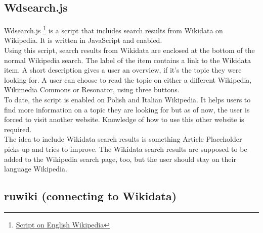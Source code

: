 \subsection{Wdsearch.js}
Wdsearch.js \footnote{\href{https://en.wikipedia.org/w/index.php?title=MediaWiki:Wdsearch.js&action=raw&ctype=text/javascript}{Script on English Wikipedia}} is a script that includes search results from Wikidata on Wikipedia. It is written in JavaScript and enabled. \\
Using this script, search results from Wikidata are enclosed at the bottom of the normal Wikipedia search. The label of the item contains a link to the Wikidata item. A short description gives a user an overview, if it's the topic they were looking for. A user can choose to read the topic on either a different Wikipedia, Wikimedia Commons or Resonator, using three buttons. \\
To date, the script is enabled on Polish and Italian Wikipedia. It helps users to find more information on a topic they are looking for but as of now, the user is forced to visit another website. Knowledge of how to use this other website is required. \\
The idea to include Wikidata search results is something Article Placeholder picks up and tries to improve. The Wikidata search results are supposed to be added to the Wikipedia search page, too, but the user should stay on their language Wikipedia.

\subsection{ruwiki (connecting to Wikidata)}